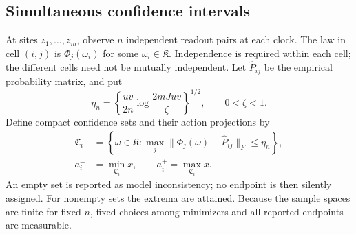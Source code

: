 \subsection{Simultaneous confidence intervals}
At sites $z_1,\ldots,z_m$, observe $n$ independent readout pairs at
each clock. The law in cell $(i,j)$ is $\Phi_j(\omega_i)$ for some
$\omega_i\in\mathfrak K$. Independence is required within each
cell; the different cells need not be mutually independent. Let
$\widehat P_{ij}$ be the empirical probability matrix, and put
\begin{equation}\label{eq:v85-radius}
 \eta_n=\left\{\frac{uv}{2n}
               \log\frac{2mJuv}{\zeta}\right\}^{1/2},
                    \qquad 0<\zeta<1.
\end{equation}
Define compact confidence sets and their action projections by
\begin{align}
 \mathfrak C_i&=\left\{\omega\in\mathfrak K:
        \max_j\|\Phi_j(\omega)-\widehat P_{ij}\|_F\le\eta_n\right\},
                                                   \label{eq:v85-confidence}\\
 a_i^-&=\min_{\mathfrak C_i}x,\qquad
 a_i^+=\max_{\mathfrak C_i}x.\nonumber
\end{align}
An empty set is reported as model inconsistency; no endpoint is then
silently assigned. For nonempty sets the extrema are attained.
Because the sample spaces are finite for fixed $n$, fixed choices
among minimizers and all reported endpoints are measurable.


